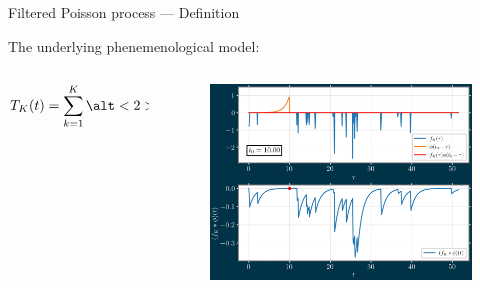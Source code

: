 \begin{frame}{Filtered Poisson process --- Definition}

    The underlying phenemenological model:

    \begin{columns}
        \begin{column}{.51\linewidth}
            \begin{equation}\label{eq:fpp_sum}
                T_K(t)=\sum_{k=1}^{K} \alt<2>{\alert{A_k}}{A_k} \phi
                \left(\frac{t-\alt<3>{\alert{t_k}}{t_k}}{\alt<4>{\alert{\tau_\mathrm{d}}}{\tau_\mathrm{d}}}\right)
            \end{equation}
        \end{column}
        \begin{column}{.65\linewidth}
            \begin{figure}
                \centering
                \includegraphics[width=.8\linewidth]{anim.png}
            \end{figure}
        \end{column}
    \end{columns}


\end{frame}
